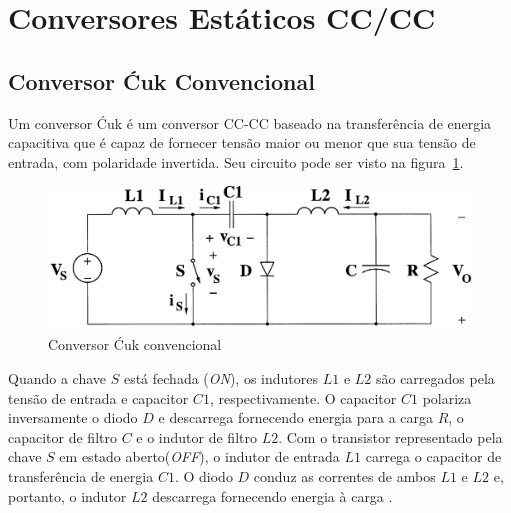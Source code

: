 \documentclass[
	12pt,				%
	openany,
	onseside,
	a4paper,			%
	english,			%
	french,				%
	spanish,			%
	brazil,				%
	]{abntex2}
\begin{document}
\section{Conversores Estáticos CC/CC}

\subsection{Conversor Ćuk Convencional}

Um conversor Ćuk é um conversor CC-CC baseado na transferência de energia capacitiva que é capaz de fornecer tensão maior ou menor que sua tensão de entrada, com polaridade invertida. Seu circuito pode ser visto na figura~\ref{fig:conv_cuk_circuit}. 

\begin{figure}[htbp]
	\centering
		\includegraphics[width=0.55 \linewidth]{conv_cuk_circuit}
		\caption{Conversor Ćuk convencional \cite{RASHID_CUK}}
		\label{fig:conv_cuk_circuit}
\end{figure}


Quando a chave $S$ está fechada (\textit{ON}), os indutores $L1$ e $L2$ são carregados pela tensão de entrada e capacitor $C1$, respectivamente. O capacitor $C1$ polariza inversamente o diodo $D$ e descarrega fornecendo energia para a carga $R$, o capacitor de filtro $C$ e o indutor de filtro $L2$.
Com o transistor representado pela chave $S$ em estado aberto(\textit{OFF}), o indutor de entrada $L1$ carrega o capacitor de transferência de energia $C1$. O diodo $D$ conduz as correntes de ambos $L1$ e $L2$ e, portanto, o indutor $L2$ descarrega fornecendo energia à carga \cite{RASHID_CUK} \cite{JOSEPH_2015_Intervealed_CUK}. 
\end{document}
